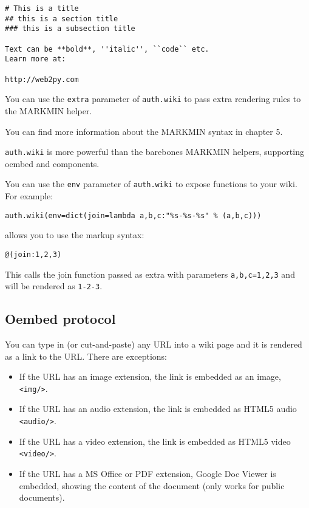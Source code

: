 \documentclass[justified,sixbynine,notoc]{tufte-book}
\def\ft{\small\tt}
\begin{document}
\begin{fullwidth}
\begin{lstlisting}
# This is a title
## this is a section title
### this is a subsection title

Text can be **bold**, ''italic'', ``code`` etc.
Learn more at:

http://web2py.com
\end{lstlisting}

You can use the {\ft extra} parameter of {\ft auth.wiki} to pass extra rendering rules to the MARKMIN helper.

You can find more information about the MARKMIN syntax in chapter 5.

{\ft auth.wiki} is more powerful than the barebones MARKMIN helpers, supporting oembed and components.

You can use the {\ft env} parameter of {\ft auth.wiki} to expose functions to your wiki.
For example:

\begin{lstlisting}
auth.wiki(env=dict(join=lambda a,b,c:"%s-%s-%s" % (a,b,c)))
\end{lstlisting}
\noindent allows you to use the markup syntax:

\begin{lstlisting}
@(join:1,2,3)
\end{lstlisting}

This calls the join function passed as extra with parameters {\ft a,b,c=1,2,3} and will be rendered as {\ft 1-2-3}.

\goodbreak\subsection{Oembed protocol}

You can type in (or cut-and-paste) any URL into a wiki page and it is rendered as a link to the URL. There are exceptions:

\begin{itemize}
\item If the URL has an image extension, the link is embedded as an image, {\ft <img/>}.

\item If the URL has an audio extension, the link is embedded as HTML5 audio {\ft <audio/>}.

\item If the URL has a video extension, the link is embedded as HTML5 video {\ft <video/>}.

\item If the URL has a MS Office or PDF extension, Google Doc Viewer is embedded, showing the content of the document (only works for public documents).


\end{itemize}
\end{fullwidth}
\end{document}
